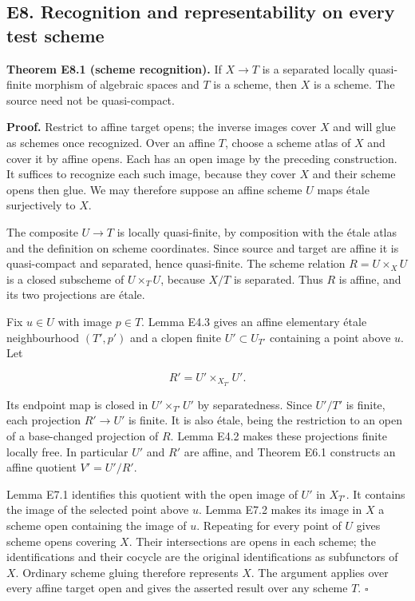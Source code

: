 \documentclass[11pt,a4paper,openany]{report}
\begin{document}
\subsection{E8. Recognition and representability on every test scheme}\label{AG-RG-S04-e8.-recognition-and-representability-on-every-test-scheme}

\textbf{Theorem E8.1 (scheme recognition).} If \(X\to T\) is a separated locally quasi-finite morphism of algebraic spaces and \(T\) is a scheme, then \(X\) is a scheme. The source need not be quasi-compact.

\textbf{Proof.} Restrict to affine target opens; the inverse images cover \(X\) and will glue as schemes once recognized. Over an affine \(T\), choose a scheme atlas of \(X\) and cover it by affine opens. Each has an open image by the preceding construction. It suffices to recognize each such image, because they cover \(X\) and their scheme opens then glue. We may therefore suppose an affine scheme \(U\) maps étale surjectively to \(X\).

The composite \(U\to T\) is locally quasi-finite, by composition with the étale atlas and the definition on scheme coordinates. Since source and target are affine it is quasi-compact and separated, hence quasi-finite. The scheme relation \(R=U\times_X U\) is a closed subscheme of \(U\times_T U\), because \(X/T\) is separated. Thus \(R\) is affine, and its two projections are étale.

Fix \(u\in U\) with image \(p\in T\). Lemma E4.3 gives an affine elementary étale neighbourhood \((T',p')\) and a clopen finite \(U'\subset U_{T'}\) containing a point above \(u\). Let

\[
R'=U'\times_{X_{T'}}U'.
\]

Its endpoint map is closed in \(U'\times_{T'}U'\) by separatedness. Since \(U'/T'\) is finite, each projection \(R'\to U'\) is finite. It is also étale, being the restriction to an open of a base-changed projection of \(R\). Lemma E4.2 makes these projections finite locally free. In particular \(U'\) and \(R'\) are affine, and Theorem E6.1 constructs an affine quotient \(V'=U'/R'\).

Lemma E7.1 identifies this quotient with the open image of \(U'\) in \(X_{T'}\). It contains the image of the selected point above \(u\). Lemma E7.2 makes its image in \(X\) a scheme open containing the image of \(u\). Repeating for every point of \(U\) gives scheme opens covering \(X\). Their intersections are opens in each scheme; the identifications and their cocycle are the original identifications as subfunctors of \(X\). Ordinary scheme gluing therefore represents \(X\). The argument applies over every affine target open and gives the asserted result over any scheme \(T\). \(\square\)
\end{document}
